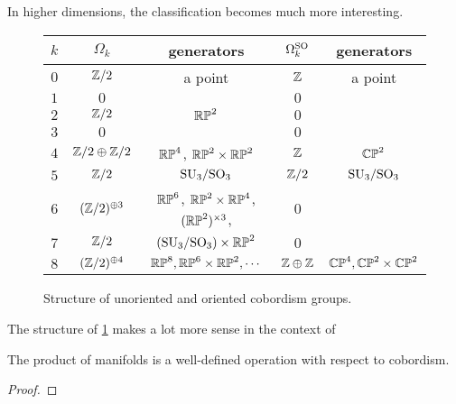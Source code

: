 In higher dimensions, the classification becomes much more interesting.

\begin{figure}[ht]
	\renewcommand{\arraystretch}{1.2}
	\centering
	\begin{tabular}{r||c|c||c|c}
		$k$ & $\Omega_k$          & generators                                          & $\Omega_k^{\mathrm{SO}}$ & generators                 \\
		\hline
		$0$ & $\mathbb{Z}/2$              & a point                                             & $\mathbb{Z}$           & a point                    \\
		$1$ & $0$                 &                                                     & $0$            &                            \\
		$2$ & $\mathbb{Z}/2$              & $\mathbb{RP}^2$                                             & $0$            &                            \\
		$3$ & $0$                 &                                                     & $0$            &                            \\
		$4$ & $\mathbb{Z}/2\oplus \mathbb{Z}/2$   & $\mathbb{RP}^4$, $\mathbb{RP}^2\times \mathbb{RP}^2$                        & $\mathbb{Z}$           & $\mathbb{CP}^2$                    \\
		$5$ & $\mathbb{Z}/2$              & $\mathrm{SU}_3/\mathrm{SO}_3$                                       & $\mathbb{Z}/2$         & $\mathrm{SU}_3/\mathrm{SO}_3$              \\
		$6$ & $(\mathbb{Z}/2)^{\oplus 3}$ & $\mathbb{RP}^6$, $\mathbb{RP}^2\times \mathbb{RP}^4$, $(\mathbb{RP}^2)^{\times 3}$, & $0$            &                            \\
		$7$ & $\mathbb{Z}/2$              & $(\mathrm{SU}_3/\mathrm{SO}_3) \times \mathbb{RP}^2$                        & $0$            &                            \\
		$8$ & $(\mathbb{Z}/2)^{\oplus 4}$ & $\mathbb{RP}^8, \mathbb{RP}^6\times \mathbb{RP}^2, \cdots$                  & $\mathbb{Z}\oplus \mathbb{Z}$  & $\mathbb{CP}^4, \mathbb{CP}^2\times \mathbb{CP}^2$ \\
	\end{tabular}
	\medskip
	\caption{Structure of unoriented and oriented cobordism groups.}\label{fig:cobordism-structure-table}
\end{figure}

The structure of \cref{fig:cobordism-structure-table} makes a lot more sense in the context of

\begin{proposition}
	The product of manifolds is a well-defined operation with respect to cobordism.
\end{proposition}
\begin{proof}
\end{proof}

